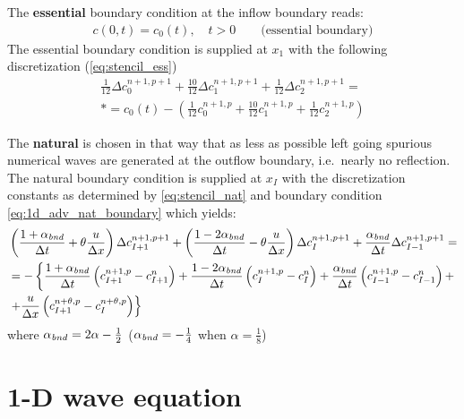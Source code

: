 The \textbf{essential} boundary condition at the inflow boundary reads:
\begin{align}
    c(0,t) = c_0(t), \quad t > 0 \qquad \text{(essential boundary)}
\end{align}
The essential boundary condition is supplied at $x_1$ with the following discretization (\autoref{eq:stencil_ess})
\begin{multline}
    \frac{1}{12} \Delta c^{n+1,p+1}_0 + \frac{10}{12} \Delta c^{n+1,p+1}_1 + \frac{1}{12}\Delta c^{n+1,p+1}_2 =
    \\*
    =c_0(t) - \left( \frac{1}{12} c^{n+1,p}_0 + \frac{10}{12} c^{n+1,p}_1 + \frac{1}{12} c^{n+1,p}_2 \right)
\end{multline}

The \textbf{natural} is chosen in that way that as less as possible left going spurious numerical waves are generated at the outflow boundary, i.e.\ nearly no reflection.
The natural boundary condition is supplied at $x_I$ with the discretization constants as determined by \autoref{eq:stencil_nat} and boundary condition \autoref{eq:1d_adv_nat_boundary} which yields:
\begin{align}
    &\left( \frac{1+\alpha_{\it bnd}}{\Delta t} + \theta \frac{u}{\Delta x} \right) \Delta c^{n+1,p+1}_{I+1} +
     \left( \frac{1-2\alpha_{\it bnd}}{\Delta t} - \theta \frac{u}{\Delta x} \right) \Delta c^{n+1,p+1}_I +
      \frac{\alpha_{\it bnd}}{\Delta t}  \Delta c^{n+1,p+1}_{I-1}  =
    \\
    & = - \left\{
          \frac{1+\alpha_{\it bnd}}{\Delta t} \left( c^{n+1,p}_{I+1} - c^n_{I+1} \right)
        + \frac{1-2\alpha_{\it bnd}}{\Delta t} \left( c^{n+1,p}_{I} - c^n_{I} \right)
        + \frac{\alpha_{\it bnd}}{\Delta t} \left( c^{n+1,p}_{I-1}- c^n_{I-1} \right) +
        \right. \\
    & \left. + \frac{u}{\Delta x} \left(c^{n+\theta,p}_{I+1} - c^{n+\theta,p}_{I} \right)
        \right\}
\end{align}
where $\alpha_{\it bnd} = 2\alpha -\frac{1}{2}$ ($\alpha_{\it bnd} = -\frac{1}{4}$ when $\alpha = \frac{1}{8}$)
\section{1-D wave equation}

